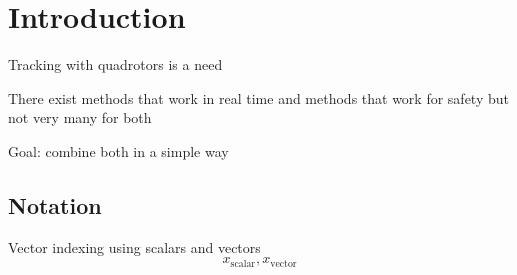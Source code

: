 \section{Introduction}
Tracking with quadrotors is a need

There exist methods that work in real time and methods that work for safety but not very many for both

Goal: combine both in a simple way

\subsection{Notation}
Vector indexing using scalars and vectors
\begin{equation}
x_\text{scalar}, x_\text{vector}
\end{equation}
